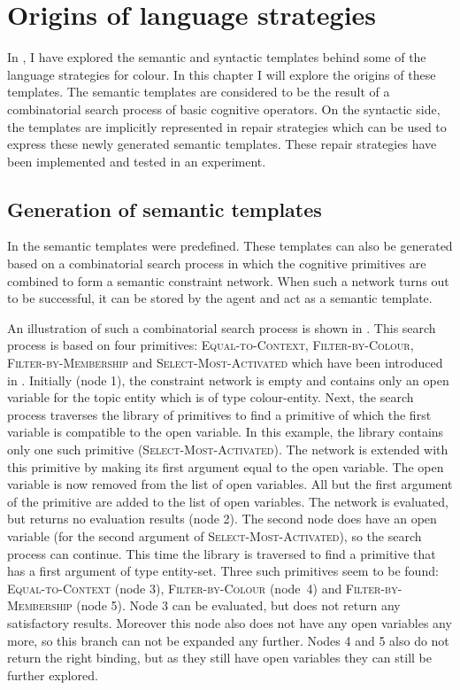 \chapter{Origins of language strategies}
\label{s:composition}

In , I have explored the semantic and
syntactic templates behind some of the language strategies for
colour. In this chapter I will explore the origins of these
templates. The semantic templates are considered to be the result of a
combinatorial search process of basic cognitive operators. On the
syntactic side, the templates are implicitly represented in repair
strategies which can be used to express these newly generated semantic
templates. These repair strategies have been implemented and tested in
an experiment.

\section{Generation of semantic templates}

In  the semantic templates were
predefined. These templates can also be generated based on a
combinatorial search process in which the cognitive primitives are
combined to form a semantic constraint network. When such a network
turns out to be successful, it can be stored by the agent and act as
a semantic template.

An illustration of such a combinatorial search process is shown in
. This search process is based on
four primitives: \textsc{Equal-to-Context}, \textsc{Filter-by-Colour},
\textsc{Filter-by-Membership} and \textsc{Select-Most-Acti\-vated}
which have been introduced in . Initially
(node 1), the constraint network is empty and contains only an open
variable for the topic entity which is of type colour-entity. Next,
the search process traverses the library of primitives to find a
primitive of which the first variable is compatible to the open
variable. In this example, the library contains only one such
primitive (\textsc{Select-Most-Activated}). The network is extended
with this primitive by making its first argument equal to the open
variable. The open variable is now removed from the list of open
variables. All but the first argument of the primitive are added to
the list of open variables. The network is evaluated, but returns no
evaluation results (node 2). The second node does have an open
variable (for the second argument of \textsc{Select-Most-Activated}),
so the search process can continue. This time the library is traversed
to find a primitive that has a first argument of type
entity-set. Three such primitives seem to be found:
\textsc{Equal-to-Context} (node 3), \textsc{Filter-by-Colour} (node~4)
and \textsc{Filter-by-Membership} (node 5). Node 3 can be evaluated,
but does not return any satisfactory results. Moreover this node also does not
have any open variables any more, so this branch can not be expanded
any further. Nodes 4 and 5 also do not return the right binding, but as
they still have open variables they can still be further explored.

